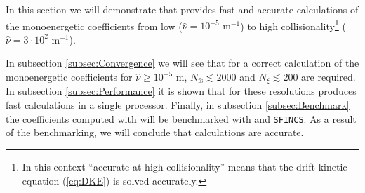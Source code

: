 In this section we will demonstrate that {\MONKES} provides fast and accurate calculations of the monoenergetic coefficients from low ($\hat{\nu}=10^{-5}$ $\text{m}^{-1}$) to high collisionality\footnote{In this context ``accurate at high collisionality'' means that the drift-kinetic equation (\ref{eq:DKE}) is solved accurately.} ($\hat{\nu}=3\cdot10^{2}$ $\text{m}^{-1}$).

In subsection \ref{subsec:Convergence} we will see that for a correct calculation of the monoenergetic coefficients for $\hat{\nu}\ge 10^{-5}$ m, $N_{\text{fs}} \lesssim  2000$ and $N_\xi \lesssim 200$ are required. In subsection \ref{subsec:Performance} it is shown that for these resolutions {\MONKES} produces fast calculations in a single processor. Finally, in subsection \ref{subsec:Benchmark} the coefficients computed with {\MONKES} will be benchmarked with {\DKES} and {\texttt{SFINCS}}. As a result of the benchmarking, we will conclude that {\MONKES} calculations are accurate.

 
 
 